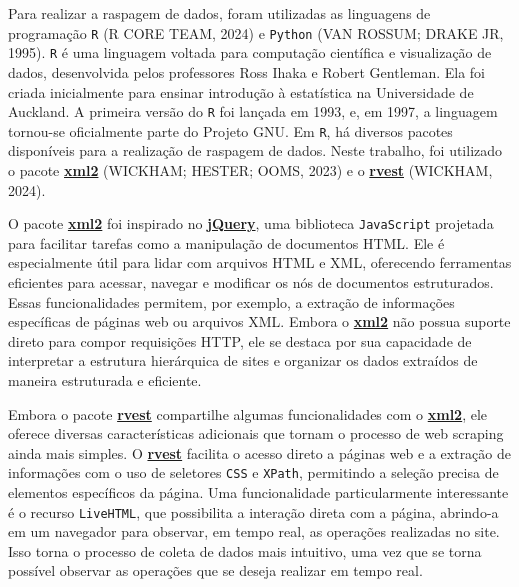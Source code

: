 \documentclass[
  12pt,
  a4paper,
]{scrreprt}
\begin{document}
Para realizar a raspagem de dados, foram utilizadas as linguagens de
programação \texttt{R} (R CORE TEAM, 2024) e \texttt{Python} (VAN
ROSSUM; DRAKE JR, 1995). \texttt{R} é uma linguagem voltada para
computação científica e visualização de dados, desenvolvida pelos
professores Ross Ihaka e Robert Gentleman. Ela foi criada inicialmente
para ensinar introdução à estatística na Universidade de Auckland. A
primeira versão do \texttt{R} foi lançada em 1993, e, em 1997, a
linguagem tornou-se oficialmente parte do Projeto GNU. Em \texttt{R}, há
diversos pacotes disponíveis para a realização de raspagem de dados.
Neste trabalho, foi utilizado o pacote
\href{https://xml2.r-lib.org/}{\textbf{xml2}} (WICKHAM; HESTER; OOMS,
2023) e o \href{https://rvest.tidyverse.org/}{\textbf{rvest}} (WICKHAM,
2024).

\vspace{12pt}

O pacote \href{https://xml2.r-lib.org/}{\textbf{xml2}} foi inspirado no
\href{https://jquery.com/}{\textbf{jQuery}}, uma biblioteca
\texttt{JavaScript} projetada para facilitar tarefas como a manipulação
de documentos HTML. Ele é especialmente útil para lidar com arquivos
HTML e XML, oferecendo ferramentas eficientes para acessar, navegar e
modificar os nós de documentos estruturados. Essas funcionalidades
permitem, por exemplo, a extração de informações específicas de páginas
web ou arquivos XML. Embora o
\href{https://xml2.r-lib.org/}{\textbf{xml2}} não possua suporte direto
para compor requisições HTTP, ele se destaca por sua capacidade de
interpretar a estrutura hierárquica de sites e organizar os dados
extraídos de maneira estruturada e eficiente.

\vspace{12pt}

Embora o pacote \href{https://rvest.tidyverse.org/}{\textbf{rvest}}
compartilhe algumas funcionalidades com o
\href{https://xml2.r-lib.org/}{\textbf{xml2}}, ele oferece diversas
características adicionais que tornam o processo de web scraping ainda
mais simples. O \href{https://rvest.tidyverse.org/}{\textbf{rvest}}
facilita o acesso direto a páginas web e a extração de informações com o
uso de seletores \texttt{CSS} e \texttt{XPath}, permitindo a seleção
precisa de elementos específicos da página. Uma funcionalidade
particularmente interessante é o recurso \texttt{LiveHTML}, que
possibilita a interação direta com a página, abrindo-a em um navegador
para observar, em tempo real, as operações realizadas no site. Isso
torna o processo de coleta de dados mais intuitivo, uma vez que se torna
possível observar as operações que se deseja realizar em tempo real.
\end{document}
